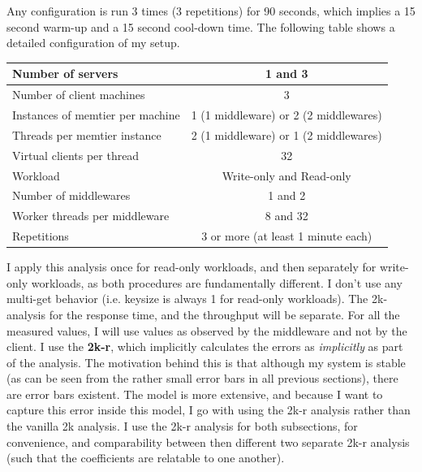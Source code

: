 \documentclass[11pt,a4paper]{article}
\begin{document}
Any configuration is run 3 times (3 repetitions) for 90 seconds, which implies a 15 second warm-up and a 15 second cool-down time.
The following table shows a detailed configuration of my setup.

\begin{center}
	\scriptsize{
		\begin{tabular}{|l|c|}
			\hline Number of servers                & 1 and 3                                     \\ 
			\hline Number of client machines        & 3                                           \\ 
			\hline Instances of memtier per machine & 1 (1 middleware) or 2 (2 middlewares) \\ 
			\hline Threads per memtier instance     & 2 (1 middleware) or 1 (2 middlewares)   \\
			\hline Virtual clients per thread       &  32                                     \\ 
			\hline Workload                         & Write-only and Read-only\\
			\hline Number of middlewares            & 1 and 2                                     \\
			\hline Worker threads per middleware    & 8 and 32                                    \\
			\hline Repetitions                      & 3 or more (at least 1 minute each)                                   \\ 
			\hline 
		\end{tabular}
	} 
\end{center}

I apply this analysis once for read-only workloads, and then separately for write-only workloads, as both procedures are fundamentally different.
I don't use any multi-get behavior (i.e. keysize is always 1 for read-only workloads).
The 2k-analysis for the response time, and the throughput will be separate.
For all the measured values, I will use values as observed by the middleware and not by the client. 
I use the \textbf{2k-r}, which implicitly calculates the errors as \textit{implicitly} as part of the analysis. 
The motivation behind this is that although my system is stable (as can be seen from the rather small error bars in all previous sections), there are error bars existent.
The model is more extensive, and because I want to capture this error inside this model, I go with using the 2k-r analysis rather than the vanilla 2k analysis.
I use the 2k-r analysis for both subsections, for convenience, and comparability between then different two separate 2k-r analysis (such that the coefficients are relatable to one another).
\\
\end{document}
